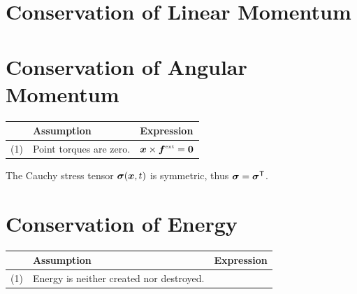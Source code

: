 \section{Conservation of Linear Momentum}

\section{Conservation of Angular Momentum}

\be
\begin{tabular}{cl|l}
 &
 {\bf Assumption}
 &
 {\bf Expression} \\ \hline \hline
 (1) 
 &
 Point torques are zero. 
 &
 $\vx \times \vfext = \vzero$
 \\ 
\end{tabular}
\ee
\begin{Hresult}
The Cauchy stress tensor $\mbox{\boldmath $\sigma$}(\mbox{\boldmath $x$}, t)$ is symmetric, thus
 $\mbox{\boldmath $\sigma$} = \mbox{\boldmath $\sigma$}^{\mbox{\scriptsize \sffamily T}}$.
\end{Hresult}

\section{Conservation of Energy}
\be
\begin{tabular}{cl|l}
 &
 {\bf Assumption}
 &
 {\bf Expression} \\ \hline \hline
 (1) 
 &
 Energy is neither created nor destroyed.
 &
  
 \\ 
\end{tabular}
\ee

